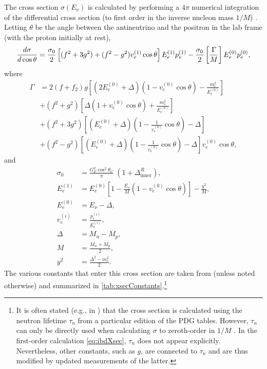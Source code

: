 \documentclass[../thesis.tex]{subfiles}
\begin{document}
The cross section $\sigma(E_\nu)$ is calculated by performing a $4\pi$ numerical integration of the differential cross section (to first order in the inverse nucleon mass $1/M$) \cite{Vogel_1999}. Letting $\theta$ be the angle between the antineutrino and the positron in the lab frame (with the proton initially at rest),
\begin{equation}
  \label{eq:ibdXsec}
  \frac{d\sigma}{d\cos\theta} = \frac{\sigma_0}{2}
  \left[\vphantom{\frac{\sigma_0}{2}}
    (f^2 + 3g^2) + (f^2 - g^2) v_e^{(1)} \cos\theta\right]
  E_e^{(1)} p_e^{(1)} 
  - \frac{\sigma_0}{2}
  \left[\frac{\Gamma}{M}\right]
  E_e^{(0)} p_e^{(0)}, 
\end{equation}
where
\begin{equation}
  \begin{aligned}
  \Gamma & =
  2 (f + f_2) g
  \left[ (2 E_e^{(0)} + \Delta ) ( 1 - v_e^{(0)}\cos\theta)
    -\frac{m_e^2}{E_e^{(0)}} \right] \\
  & +
  (f^2 + g^2)
  \left[ \Delta( 1 + v_e^{(0)}\cos\theta)
    + \frac{m_e^2}{E_e^{(0)}} \right] \\
  & + 
  (f^2 + 3g^2)
  \left[ (E_e^{(0)} + \Delta) (1 - \frac{1}{v_e^{(0)}}\cos\theta) - 
    \Delta\right] \\
  & +
  (f^2 - g^2)
  \left[ (E_e^{(0)} + \Delta) (1 - \frac{1}{v_e^{(0)}}\cos\theta) - 
    \Delta\right] v_e^{(0)} \cos\theta,
\end{aligned}
\end{equation}
and
\begin{align}
  \sigma_0 &= \frac{G_F^2 \cos^2\theta_C}{\pi}\; (1 + \Delta^R_{\mathrm{inner}}), \\
  \label{eq:firstOrderEnergy}
  E_e^{(1)} &= E_e^{(0)}
  \left[1 - \frac{E_{\nu}}{M}(1 - v_e^{(0)} \cos \theta) \right]
              - \frac{y^2}{M}, \\
  E_e^{(0)} &= E_\nu - \Delta, \\
  v_e^{(i)} &= \frac{p_e^{(i)}}{E_e^{(i)}}, \\
  \Delta &= M_n - M_p, \\
  M &= \frac{M_n + M_p}{2}, \\
  y^2 &= \frac{\Delta^2 - m_e^2}{2}.
\end{align}
The various constants that enter this cross section are taken from \cite{pdg2011} (unless noted otherwise) and summarized in \autoref{tab:xsecConstants}.\footnote{It is often stated (e.g., in \cite{spectrum2017}) that the cross section is calculated using the neutron lifetime $\tau_n$ from a particular edition of the PDG tables. However, $\tau_n$ can only be directly used when calculating $\sigma$ to zeroth-order in $1/M$ \cite{Vogel_1999}. In the first-order calculation \autoref{eq:ibdXsec}, $\tau_n$ does not appear explicitly. Nevertheless, other constants, such as $g$, are connected to $\tau_n$ and are thus modified by updated measurements of the latter.}
\end{document}
